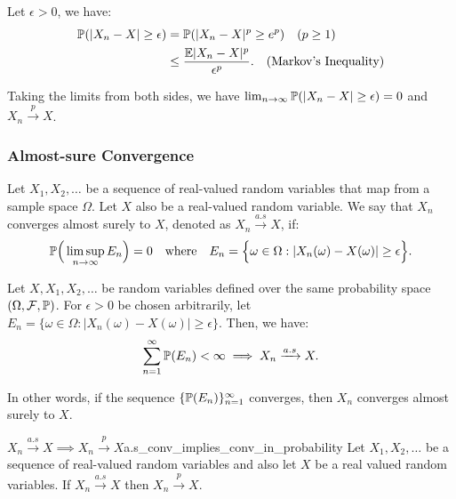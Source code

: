 \begin{proof*}
    Let $\epsilon>0$, we have:
    \begin{align*}
        \mathbb{P}(|X_n - X| \ge \epsilon) &= \mathbb{P}(|X_n - X|^p \ge e^p) \quad (p\ge 1) \\
            &\le \frac{\mathbb{E}|X_n - X|^p}{\epsilon^p}. \quad (\text{Markov's Inequality})
    \end{align*}

    \noindent Taking the limits from both sides, we have $\lim_{n\to\infty}\mathbb{P}(|X_n-X|\ge \epsilon) = 0$ and $X_n\xrightarrow{p}X$.
\end{proof*}

\subsubsection{Almost-sure Convergence}
\begin{definition}
    Let $X_1, X_2, \dots$ be a sequence of real-valued random variables that map from a sample space $\Omega$. Let $X$ also be a real-valued random variable. We say that $X_n$ converges almost surely to $X$, denoted as $X_n\xrightarrow{a.s}X$, if:
    \begin{align*}
        \mathbb{P}\Big( 
            \limsup_{n\to\infty} E_n
         \Big) = 0 \quad \text{where} \quad E_n = \Big\{ 
            \omega\in\Omega: |X_n(\omega) - X(\omega)| \ge \epsilon
         \Big\}.
    \end{align*} 
\end{definition}

\begin{remark}
    Let $X, X_1, X_2, \dots$ be random variables defined over the same probability space $(\Omega, \mathcal{F}, \mathbb{P})$. For $\epsilon>0$ be chosen arbitrarily, let $E_n = \{ \omega\in\Omega: |X_n(\omega) - X(\omega)| \ge \epsilon \}$. Then, we have:
    \begin{equation}
        \sum_{n=1}^\infty \mathbb{P}(E_n) < \infty \implies X_n\xrightarrow{a.s} X.
    \end{equation}

    \noindent In other words, if the sequence $\{\mathbb{P}(E_n)\}_{n=1}^\infty$ converges, then $X_n$ converges almost surely to $X$.
\end{remark}

\begin{proposition}{$X_n\xrightarrow{a.s}X\implies X_n\xrightarrow{p}X$}{a.s_conv_implies_conv_in_probability}
    Let $X_1, X_2,\dots$ be a sequence of real-valued random variables and also let $X$ be a real valued random variables. If $X_n\xrightarrow{a.s}X$ then $X_n\xrightarrow{p}X$.    
\end{proposition}

